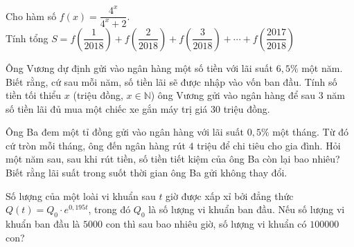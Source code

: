 \begin{bt}%
Cho hàm số $f(x)=\dfrac{4^x}{4^x+2}$.\\ Tính tổng $S=f\left(\dfrac{1}{2018}\right)+f\left(\dfrac{2}{2018}\right)+f\left(\dfrac{3}{2018}\right)+\cdots+f\left(\dfrac{2017}{2018}\right)$
\end{bt}
\begin{bt}%
Ông Vương dự định gửi vào ngân hàng một số tiền với lãi suất $6{,}5\%$ một năm. Biết rằng, cứ sau mỗi năm, số tiền lãi sẽ được nhập vào vốn ban đầu. Tính số tiền tối thiểu $x$ (triệu đồng, $x\in \mathbb{N}$) ông Vương gửi vào ngân hàng để sau $3$ năm số tiền lãi đủ mua một chiếc xe gắn máy trị giá $30$ triệu đồng.
\end{bt}

\begin{bt}%
Ông Ba đem một tỉ đồng gửi vào ngân hàng với lãi suất $0{,}5\%$ một tháng. Từ đó cứ tròn mỗi tháng, ông đến ngân hàng rút $4$ triệu để chi tiêu cho gia đình. Hỏi một năm sau, sau khi rút tiền, số tiền tiết kiệm của ông Ba còn lại bao nhiêu? Biết rằng lãi suất trong suốt thời gian ông Ba gửi không thay đổi.
\end{bt}



\begin{bt}%
Số lượng của một loài vi khuẩn sau $t$ giờ được xấp xỉ bởi đẳng thức $Q(t)=Q_0\cdot e ^{0{,}195 t}$, trong đó $Q_0$ là số lượng vi khuẩn ban đầu. Nếu số lượng vi khuẩn ban đầu là $5000$ con thì sau bao nhiêu giờ, số lượng vi khuẩn có $100000$ con?
\end{bt}

